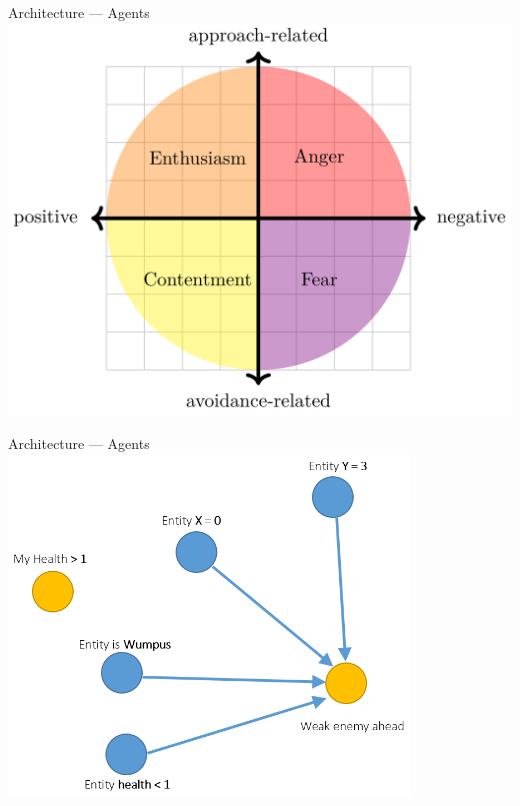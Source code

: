 \documentclass{beamer}
\begin{document}
   \begin{frame}{Architecture --- Agents}
      \includegraphics[width=\textwidth]{../Thesis/Figs/PSBC.png}
   \end{frame}
      
   \begin{frame}{Architecture --- Agents}
         \includegraphics[width=0.8\textwidth]{anger_filter.png}
   \end{frame}
   
\end{document}

